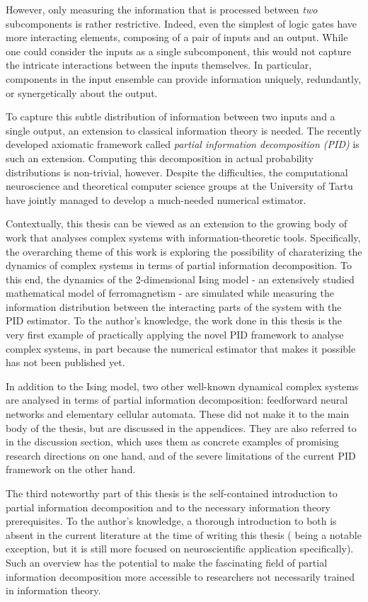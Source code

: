 \documentclass[12pt]{article}
\begin{document}
However, only measuring the information that is processed between \textit{two} subcomponents is rather restrictive. Indeed, even the simplest of logic gates have more interacting elements, composing of a pair of inputs and an output. While one could consider the inputs as a single subcomponent, this would not capture the intricate interactions between the inputs themselves. In particular, components in the input ensemble can provide information uniquely, redundantly, or synergetically about the output.  

To capture this subtle distribution of information between two inputs and a single output, an extension to classical information theory is needed. The recently developed axiomatic framework called \textit{partial information decomposition (PID)} is such an extension. Computing this decomposition in actual probability distributions is non-trivial, however. Despite the difficulties, the computational neuroscience and theoretical computer science groups at the University of Tartu have jointly managed to develop a much-needed numerical estimator. 

Contextually, this thesis can be viewed as an extension to the growing body of work that analyses complex systems with information-theoretic tools. Specifically, the overarching theme of this work is exploring the possibility of charaterizing the dynamics of complex systems in terms of partial information decomposition. To this end, the dynamics of the 2-dimensional Ising model - an extensively studied mathematical model of ferromagnetism - are simulated while measuring the information distribution between the interacting parts of the system with the PID estimator. To the author's knowledge, the work done in this thesis is the very first example of practically applying the novel PID framework to analyse complex systems, in part because the numerical estimator that makes it possible has not been published yet.

In addition to the Ising model, two other well-known dynamical complex systems are analysed in terms of partial information decomposition: feedforward neural networks and elementary cellular automata. These did not make it to the main body of the thesis, but are discussed in the appendices. They are also referred to in the discussion section, which uses them as concrete examples of promising research directions on one hand, and of the severe limitations of the current PID framework on the other hand. 

The third noteworthy part of this thesis is the self-contained introduction to partial information decomposition and to the necessary information theory prerequisites. To the author's knowledge, a thorough introduction to both is absent in the current literature at the time of writing this thesis (\cite{bits-from-brains} being a notable exception, but it is still more focused on neuroscientific application specifically). Such an overview has the potential to make the fascinating field of partial information decomposition more accessible to researchers not necessarily trained in information theory.  
\end{document}
